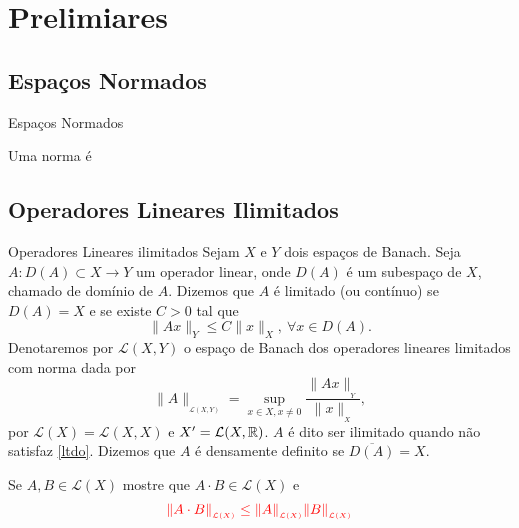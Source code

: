 \section{Prelimiares}

\subsection*{Espaços Normados}

\begin{frame}{Espaços Normados}
\begin{defin}
    Uma {\color{blue} norma} é
\end{defin}
\end{frame}

\subsection*{Operadores Lineares Ilimitados}

\begin{frame}{Operadores Lineares ilimitados}
Sejam $X$ e $Y$ dois espaços de Banach. Seja $A:D(A)\subset X\longrightarrow Y$ um operador linear,  onde $D(A)$ é um subespaço de $X$, chamado de {\color{blue} domínio} de $A$.
\medskip
Dizemos que $A$ é {\color{blue}limitado (ou contínuo)} se $D(A)=X$ e se existe  $C>0$ tal que 
\begin{equation}\label{ltdo}
\|Ax\|_{Y}\leq C\|x\|_X, \ \forall x\in D(A).
\end{equation}
Denotaremos por $\mathcal{L}(X,Y)$ o espaço de Banach dos {\color{blue} operadores lineares limitados} com norma dada por
\[\|A\|_{_{\mathcal{L}(X,Y)}}=\sup\limits_{x\in X, x\neq 0}\frac{\|Ax\|_{_Y}}{\|x\|_{_X}},\]
por $\mathcal{L}(X)=\mathcal{L}(X,X)$ e $X'=\mathcal{L}(X,\mathbb{R})$.
$A$ é dito ser {\color{blue}ilimitado} quando não satisfaz \eqref{ltdo}. Dizemos que $A$ é {\color{blue}densamente definito} se $\overline{D(A)}=X$.
\end{frame}

\begin{frame}{ }
\begin{exe}

\end{exe}
\begin{exer}
Se $A,B\in \mathcal{L}(X)$ mostre que $A\cdot B\in \mathcal{L}(X)$ e 
\[{\color{red}\|A\cdot B\|_{_{\mathcal{L}(X)}}\leq \|A\|_{_{\mathcal{L}(X)}}\|B\|_{_{\mathcal{L}(X)}} }\]
\end{exer}
\end{frame}

